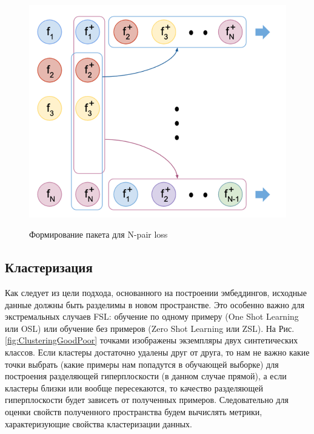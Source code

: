 \begin{figure}[h!]
\caption{Формирование пакета для N-pair loss}
\centering
\includegraphics[width=12cm]{Images/N_pair_batch.png}
\label{fig:N_pair_batch}
\end{figure}

\subsection{Кластеризация}
    Как следует из цели подхода, основанного на построении эмбеддингов, исходные данные должны быть разделимы в новом пространстве. Это особенно важно для экстремальных случаев FSL: обучение по одному примеру (One Shot Learning или OSL) или обучение без примеров (Zero Shot Learning или ZSL). На Рис. \ref{fig:ClusteringGoodPoor} точками изображены экземпляры двух синтетических классов. Если кластеры достаточно удалены друг от друга, то нам не важно какие точки выбрать (какие примеры нам попадутся в обучающей выборке) для построения разделяющей гиперплоскости (в данном случае прямой), а если кластеры близки или вообще пересекаются, то качество разделяющей гиперплоскости будет зависеть от полученных примеров. Следовательно для оценки свойств полученного пространства будем вычислять метрики, характеризующие свойства  кластеризации данных.

